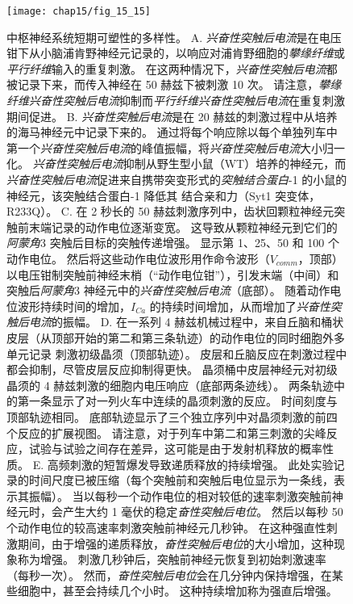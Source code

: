 \begin{figure}[htbp]
	\centering
	\texttt{[image: chap15/fig\_15\_15]}
	\caption{中枢神经系统短期可塑性的多样性。
		A. \textit{兴奋性突触后电流}是在电压钳下从小脑浦肯野神经元记录的，以响应对浦肯野细胞的\textit{攀缘纤维}或\textit{平行纤维}输入的重复刺激。
		在这两种情况下，\textit{兴奋性突触后电流}都被记录下来，而传入神经在 50 赫兹下被刺激 10 次。
		请注意，\textit{攀缘纤维}\textit{兴奋性突触后电流}抑制而\textit{平行纤维}\textit{兴奋性突触后电流}在重复刺激期间促进\cite{dittman2000interplay}。
		B. \textit{兴奋性突触后电流}是在 20 赫兹的刺激过程中从培养的海马神经元中记录下来的。
		通过将每个响应除以每个单独列车中第一个\textit{兴奋性突触后电流}的峰值振幅，将\textit{兴奋性突触后电流}大小归一化。
		\textit{兴奋性突触后电流}抑制从野生型小鼠（WT）培养的神经元，而\textit{兴奋性突触后电流}促进来自携带突变形式的\textit{突触结合蛋白}-1 的小鼠的神经元，该突触结合蛋白-1 降低其  结合亲和力（Syt1 突变体，R233Q）\cite{fernandez2001synaptotagmin}。
		C. 在 2 秒长的 50 赫兹刺激序列中，齿状回颗粒神经元突触前末端记录的动作电位逐渐变宽。
		这导致从颗粒神经元到它们的 \textit{阿蒙角}3 突触后目标的突触传递增强。
		显示第 1、25、50 和 100 个动作电位。
		然后将这些动作电位波形用作命令波形（$V_{comm}$，顶部）以电压钳制突触前神经末梢（“动作电位钳”），引发末端（中间）和 突触后\textit{阿蒙角}3 神经元中的\textit{兴奋性突触后电流}（底部）。
		随着动作电位波形持续时间的增加，$I_{Ca}$ 的持续时间增加，从而增加了\textit{兴奋性突触后电流}的振幅\cite{geiger2000dynamic}。
		D. 在一系列 4 赫兹机械过程中，来自丘脑和桶状皮层（从顶部开始的第二和第三条轨迹）的动作电位的同时细胞外多单元记录 刺激初级晶须（顶部轨迹）。
		皮层和丘脑反应在刺激过程中都会抑制，尽管皮层反应抑制得更快。
		晶须桶中皮层神经元对初级晶须的 4 赫兹刺激的细胞内电压响应（底部两条迹线）。
		两条轨迹中的第一条显示了对一列火车中连续的晶须刺激的反应。
		时间刻度与顶部轨迹相同。
		底部轨迹显示了三个独立序列中对晶须刺激的前四个反应的扩展视图。
		请注意，对于列车中第二和第三刺激的尖峰反应，试验与试验之间存在差异，这可能是由于发射机释放的概率性质\cite{chung2002short}。
		E. 高频刺激的短暂爆发导致递质释放的持续增强。
		此处实验记录的时间尺度已被压缩（每个突触前和突触后电位显示为一条线，表示其振幅）。
		当以每秒一个动作电位的相对较低的速率刺激突触前神经元时，会产生大约 1 毫伏的稳定\textit{奋性突触后电位}。
		然后以每秒 50 个动作电位的较高速率刺激突触前神经元几秒钟。
		在这种强直性刺激期间，由于增强的递质释放，\textit{奋性突触后电位}的大小增加，这种现象称为增强。
		刺激几秒钟后，突触前神经元恢复到初始刺激速率（每秒一次）。
		然而，\textit{奋性突触后电位}会在几分钟内保持增强，在某些细胞中，甚至会持续几个小时。
		这种持续增加称为强直后增强。}
	\label{fig:15_15}
\end{figure}


